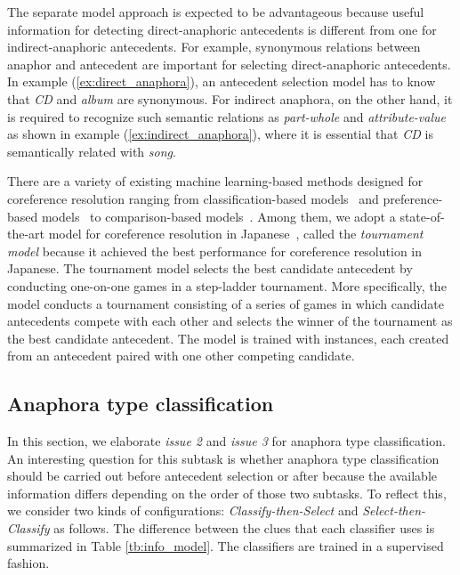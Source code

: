 \documentclass[english]{jnlp_1.4}
\begin{document}
The separate model approach is expected to be advantageous because
useful information for detecting direct-anaphoric antecedents is
different from one for indirect-anaphoric antecedents. For example,
synonymous relations between anaphor and antecedent are
important for selecting direct-anaphoric antecedents. In example
(\ref{ex:direct_anaphora}), an antecedent selection model has to know
that \textit{ CD} and \textit{album} are synonymous. For indirect
anaphora, on the other hand, it is required to recognize such semantic
relations as \emph{part-whole} and \emph{attribute-value} as shown in
example (\ref{ex:indirect_anaphora}), where it is essential that
\emph{CD} is semantically related with \emph{song}.

There are a variety of existing machine learning-based methods
designed for coreference resolution ranging from classification-based
models~ and preference-based
models~ to comparison-based
models~. Among them, we adopt a
state-of-the-art model for coreference resolution in
Japanese~, called the \emph{tournament model}
because it achieved the best performance for coreference resolution in
Japanese. The tournament model selects the best candidate antecedent
by conducting one-on-one games in a step-ladder tournament. More
specifically, the model conducts a tournament consisting of a series
of games in which candidate antecedents compete with each other and
selects the winner of the tournament as the best candidate
antecedent. The model is trained with instances, each created from an
antecedent paired with one other competing candidate.



\subsection{Anaphora type classification}
\label{sec:anaphora_type_classification}

In this section, we elaborate \emph{issue 2} and \emph{issue 3} for
anaphora type classification. An interesting question for this subtask
is whether anaphora type classification should be carried out before
antecedent selection or after because the available information
differs depending on the order of those two subtasks. To reflect this,
we consider two kinds of configurations: \emph{Classify-then-Select}
and \emph{Select-then-Classify} as follows. The difference between the
clues that each classifier uses is summarized in Table
\ref{tb:info_model}. The classifiers are trained in a supervised
fashion.
\end{document}

